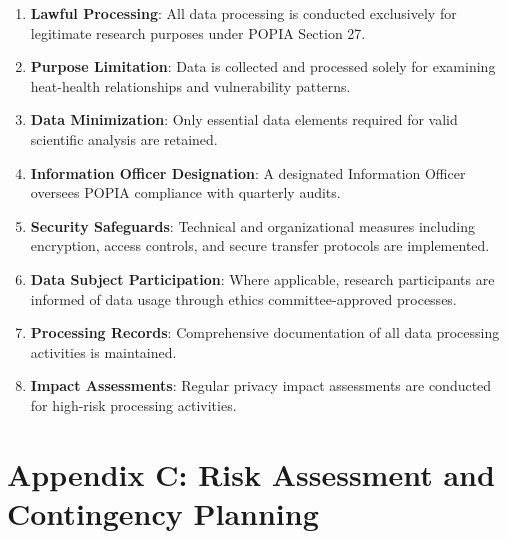 \documentclass[12pt,a4paper,landscape]{article}
\begin{document}
\begin{enumerate}[leftmargin=*, itemsep=0.5em]
    \item \textbf{Lawful Processing}: All data processing is conducted exclusively for legitimate research purposes under POPIA Section 27.
    \item \textbf{Purpose Limitation}: Data is collected and processed solely for examining heat-health relationships and vulnerability patterns.
    \item \textbf{Data Minimization}: Only essential data elements required for valid scientific analysis are retained.
    \item \textbf{Information Officer Designation}: A designated Information Officer oversees POPIA compliance with quarterly audits.
    \item \textbf{Security Safeguards}: Technical and organizational measures including encryption, access controls, and secure transfer protocols are implemented.
    \item \textbf{Data Subject Participation}: Where applicable, research participants are informed of data usage through ethics committee-approved processes.
    \item \textbf{Processing Records}: Comprehensive documentation of all data processing activities is maintained.
    \item \textbf{Impact Assessments}: Regular privacy impact assessments are conducted for high-risk processing activities.
\end{enumerate}
\clearpage

\section*{Appendix C: Risk Assessment and Contingency Planning}
\end{document}
